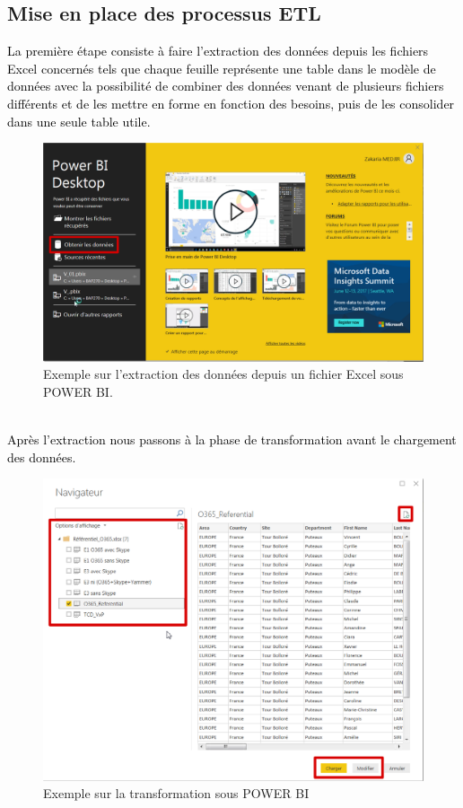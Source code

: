 \documentclass[a4paper,12pt]{report}
\begin{document}
\subsection*{Mise en place des processus ETL}

\textcolor{black}{La première étape consiste à faire l’extraction des données depuis les fichiers Excel concernés tels que chaque feuille représente une table dans le modèle de données avec la possibilité de combiner des données venant de plusieurs fichiers différents et de les mettre en forme en fonction des besoins, puis de les consolider dans une seule table utile.}
\begin{figure}[H]
	\begin{center}
		\includegraphics[width=0.70\linewidth]{Projet_O365/extraction}
\end{center}
	\caption{Exemple sur l’extraction des données depuis un fichier Excel sous POWER BI.}
	\label{fig:14}	
\end{figure}
~~\\
\textcolor{black}{Après l’extraction nous passons à la phase de transformation avant  le chargement des données.}

\begin{figure}[H]
	\begin{center}
		\includegraphics[width=0.8\linewidth]{Projet_O365/modification}
\end{center}
	\caption{Exemple sur la transformation sous POWER BI}
	\label{fig:15}	
\end{figure}
\end{document}
